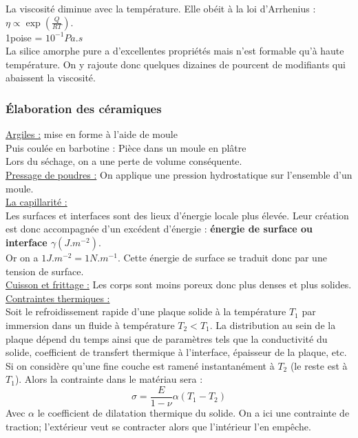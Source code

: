 \documentclass[../main.tex]{subfiles}
\begin{document}
La viscosité diminue avec la température. Elle obéit à la loi d'Arrhenius : $\eta \propto \exp{(\frac{Q}{RT})}$.\\
\color{gray} 1poise = $10^{-1}Pa.s$\color{black}\\

La silice amorphe pure a d'excellentes propriétés mais n'est formable qu'à haute température. On y rajoute donc quelques dizaines de pourcent de modifiants qui abaissent la viscosité.\\

\subsubsection{Élaboration des céramiques}

\quad \underline{Argiles :} mise en forme à l'aide de moule\\
Puis coulée en barbotine : Pièce dans un moule en plâtre\\
Lors du séchage, on a une perte de volume conséquente.\\

\quad \underline{Pressage de poudres :} On applique une pression hydrostatique sur l'ensemble d'un moule.\\

\quad \underline{La capillarité :}\\
Les surfaces et interfaces sont des lieux d'énergie locale plus élevée. Leur création est donc accompagnée d'un excédent d'énergie : \textbf{énergie de surface ou interface $\gamma(J.m^{-2})$}.\\
Or on a $1 J.m^{-2} = 1 N.m^{-1}$. Cette énergie de surface se traduit donc par une tension de surface.\\

\quad \underline{Cuisson et frittage :} Les corps sont moins poreux donc plus denses et plus solides.\\

\quad \underline{Contraintes thermiques :}\\
Soit le refroidissement rapide d'une plaque solide à la température $T_1$ par immersion dans un fluide à température $T_2< T_1$. La distribution au sein de la plaque dépend du temps ainsi que de paramètres tels que la conductivité du solide, coefficient de transfert thermique à l'interface, épaisseur de la plaque, etc. \\

Si on considère qu'une fine couche est ramené instantanément à $T_2$ (le reste est à $T_1$). Alors la contrainte dans le matériau sera : \\
\begin{equation}
    \sigma = \frac{E}{1-\nu} \alpha (T_1-T_2)
\end{equation}
Avec $\alpha$ le coefficient de dilatation thermique du solide. On a ici une contrainte de traction; l'extérieur veut se contracter alors que l'intérieur l'en empêche.\\
\end{document}
